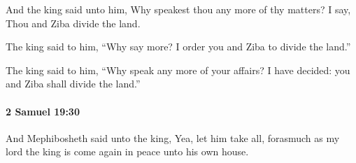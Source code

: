 			\begin{versebox}
					\item[BHS] 
					\item[ASV] And the king said unto him, Why speakest thou any more of thy matters? I say, Thou and Ziba divide the land.
					\item[NIV] The king said to him, “Why say more? I order you and Ziba to divide the land.”
					\item[NRSV] The king said to him, “Why speak any more of your affairs? I have decided: you and Ziba shall divide the land.”
			\end{versebox}

		\paragraph{2 Samuel 19:30} %
			\label{2SAMUEL-19-30}

			And Mephibosheth said unto the king, Yea, let him take all, forasmuch as my lord the king is come again in peace unto his own house.

